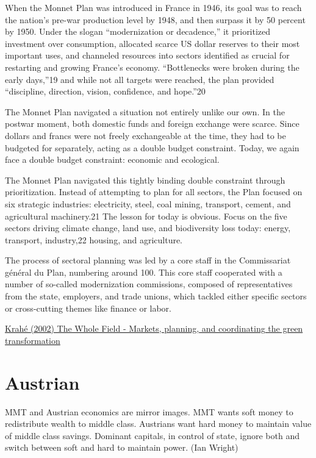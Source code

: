 \documentclass[
]{book}
\begin{document}
When the Monnet Plan was introduced in France in 1946, its goal was to reach the nation's pre-war production level by 1948, and then surpass it by 50 percent by 1950. Under the slogan ``modernization or decadence,'' it prioritized investment over consumption, allocated scarce US dollar reserves to their most important uses, and channeled resources into sectors identified as crucial for restarting and growing France's economy. ``Bottlenecks were broken during the early days,''19 and while not all targets were reached, the plan provided ``discipline, direction, vision, confidence, and hope.''20

The Monnet Plan navigated a situation not entirely unlike our own. In the postwar moment, both domestic funds and foreign exchange were scarce. Since dollars and francs were not freely exchangeable at the time, they had to be budgeted for separately, acting as a double budget constraint. Today, we again face a double budget constraint: economic and ecological.

The Monnet Plan navigated this tightly binding double constraint through prioritization. Instead of attempting to plan for all sectors, the Plan focused on six strategic industries: electricity, steel, coal mining, transport, cement, and agricultural machinery.21 The lesson for today is obvious. Focus on the five sectors driving climate change, land use, and biodiversity loss today: energy, transport, industry,22 housing, and agriculture.

The process of sectoral planning was led by a core staff in the Commissariat général du Plan, numbering around 100. This core staff cooperated with a number of so-called modernization commissions, composed of representatives from the state, employers, and trade unions, which tackled either specific sectors or cross-cutting themes like finance or labor.

\href{https://www.phenomenalworld.org/analysis/climate-planning/}{Krahé (2002) The Whole Field - Markets, planning, and coordinating the green transformation}

\hypertarget{austrian}{%
\chapter{Austrian}\label{austrian}}

MMT and Austrian economics are mirror images. MMT wants soft money to redistribute wealth to middle class. Austrians want hard money to maintain value of middle class savings. Dominant capitals, in control of state, ignore both and switch between soft and hard to maintain power.
(Ian Wright)
\end{document}
